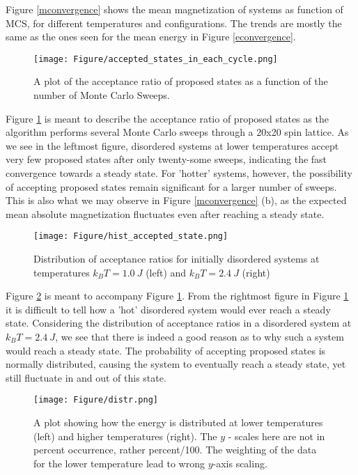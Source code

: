 Figure \ref{mconvergence} shows the mean magnetization of systems as function of MCS, for different temperatures and configurations. The trends are mostly the same as the ones seen for the mean energy in Figure \ref{econvergence}.

\begin{figure}[H]
    \centering
    \texttt{[image: Figure/accepted\_states\_in\_each\_cycle.png]}
    \caption{A plot of the acceptance ratio of proposed states as a function of the number of Monte Carlo Sweeps.}
    \label{fig:acceptanceratio}
\end{figure}
Figure \ref{fig:acceptanceratio} is meant to describe the acceptance ratio of proposed states as the algorithm performs several Monte Carlo sweeps through a 20x20 spin lattice. As we see in the leftmost figure, disordered systems at lower temperatures accept very few proposed states after only twenty-some sweeps, indicating the fast convergence towards a steady state. For 'hotter' systems, however, the possibility of accepting proposed states remain significant for a larger number of sweeps. This is also what we may observe in Figure \ref{mconvergence} (b), as the expected mean absolute magnetization fluctuates even after reaching a steady state.\\

\begin{figure}[H]
    \centering
    \texttt{[image: Figure/hist\_accepted\_state.png]}
    \caption{Distribution of acceptance ratios for initially disordered systems at temperatures $k_B T = 1.0\ J$ (left) and $k_B T = 2.4\ J$ (right)}
    \label{fig:acceptanceratiodist}
\end{figure}

Figure \ref{fig:acceptanceratiodist} is meant to accompany Figure \ref{fig:acceptanceratio}. From the rightmost figure in Figure \ref{fig:acceptanceratio} it is difficult to tell how a 'hot' disordered system would ever reach a steady state. Considering the distribution of acceptance ratios in a disordered system at $k_B T = 2.4\ J$, we see that there is indeed a good reason as to why such a system would reach a steady state. The probability of accepting proposed states is normally distributed, causing the system to eventually reach a steady state, yet still fluctuate in and out of this state.\\

\begin{figure}[H]
    \centering
    \texttt{[image: Figure/distr.png]}
    \caption{A plot showing how the energy is distributed at lower temperatures (left) and higher temperatures (right). The $y$ - scales here are not in percent occurrence, rather percent/100. The weighting of the data for the lower temperature lead to wrong $y$-axis scaling. }
    \label{fig:edistr}
\end{figure}

